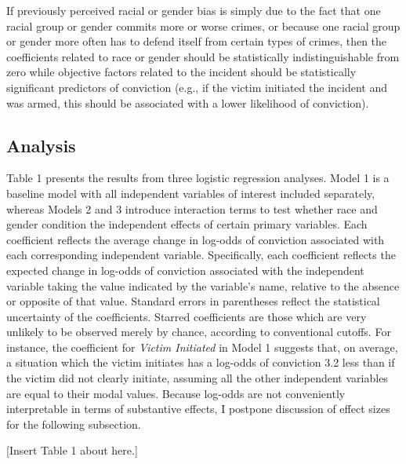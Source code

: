 \documentclass[12pt,article]{article}
\begin{document}
If previously perceived racial or gender bias is simply due to the fact
that one racial group or gender commits more or worse crimes, or because
one racial group or gender more often has to defend itself from certain
types of crimes, then the coefficients related to race or gender should
be statistically indistinguishable from zero while objective factors
related to the incident should be statistically significant predictors
of conviction (e.g., if the victim initiated the incident and was armed,
this should be associated with a lower likelihood of conviction).

\subsection{Analysis}\label{analysis}

Table 1 presents the results from three logistic regression analyses.
Model 1 is a baseline model with all independent variables of interest
included separately, whereas Models 2 and 3 introduce interaction terms
to test whether race and gender condition the independent effects of
certain primary variables. Each coefficient reflects the average change
in log-odds of conviction associated with each corresponding independent
variable. Specifically, each coefficient reflects the expected change in
log-odds of conviction associated with the independent variable taking
the value indicated by the variable's name, relative to the absence or
opposite of that value. Standard errors in parentheses reflect the
statistical uncertainty of the coefficients. Starred coefficients are
those which are very unlikely to be observed merely by chance, according
to conventional cutoffs. For instance, the coefficient for \emph{Victim
Initiated} in Model 1 suggests that, on average, a situation which the
victim initiates has a log-odds of conviction 3.2 less than if the
victim did not clearly initiate, assuming all the other independent
variables are equal to their modal values. Because log-odds are not
conveniently interpretable in terms of substantive effects, I postpone
discussion of effect sizes for the following subsection.

\begin{center}[Insert Table 1 about here.]\end{center}
\end{document}
